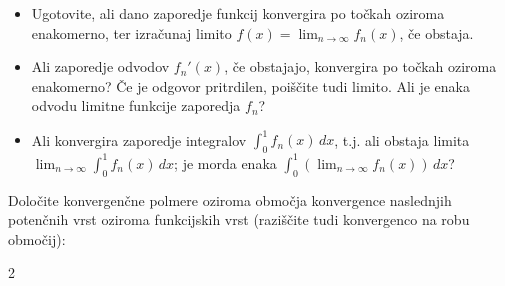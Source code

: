 \documentclass[11pt,a4paper]{exam}
\renewcommand{\{}{\lbrace}
\renewcommand{\}}{\rbrace}
\begin{document}
\begin{questions}
	\begin{itemize}
		\item Ugotovite, ali dano zaporedje funkcij konvergira po točkah oziroma enakomerno, ter izračunaj limito $f(x) = \lim_{n \to \infty} f_n(x)$, če obstaja.
		\item Ali zaporedje odvodov $f_n'(x)$, če obstajajo, konvergira po točkah oziroma enakomerno? Če je odgovor pritrdilen, poiščite tudi limito. Ali je enaka odvodu limitne funkcije zaporedja $f_n$?
		\item Ali konvergira zaporedje integralov $\int_0^1 f_n(x) \, dx$, t.j. ali obstaja limita $\lim_{n \to \infty} \int_0^1 f_n(x) \, dx$; je morda enaka $\int_0^1 (\lim_{n \to \infty} f_n(x)) \, dx$?
	\end{itemize}
	
	\question Določite konvergenčne polmere oziroma območja konvergence naslednjih potenčnih vrst oziroma funkcijskih vrst (raziščite tudi konvergenco na robu območij):
	\begin{multicols}{2}
	\end{multicols}
	
	\end{questions}
	
\end{document}
